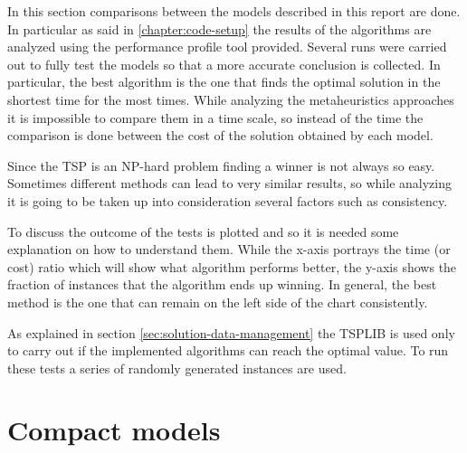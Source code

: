 In this section comparisons between the models described in this report are done. In particular as said in \ref{chapter:code-setup} the results of the algorithms are analyzed using the performance profile tool provided. Several runs were carried out to fully test the models so that a more accurate conclusion is collected. In particular, the best algorithm is the one that finds the optimal solution in the shortest time for the most times. While analyzing the metaheuristics approaches it is impossible to compare them in a time scale, so instead of the time the comparison is done between the cost of the solution obtained by each model.

Since the TSP is an NP-hard problem finding a winner is not always so easy. Sometimes different methods can lead to very similar results, so while analyzing it is going to be taken up into consideration several factors such as consistency.

To discuss the outcome of the tests is plotted and so it is needed some explanation on how to understand them. While the x-axis portrays the time (or cost) ratio which will show what algorithm performs better, the y-axis shows the fraction of instances that the algorithm ends up winning. In general, the best method is the one that can remain on the left side of the chart consistently.

As explained in section \ref{sec:solution-data-management} the TSPLIB is used only to carry out if the implemented algorithms can reach the optimal value. To run these tests a series of randomly generated instances are used.

\section{Compact models}
\label{sec:results-compact}

